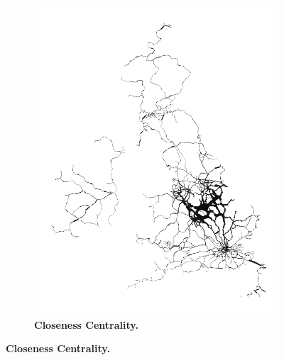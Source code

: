 \begin{figure}[H]
\begin{subfigure}[b]{.49\textwidth}
         \includegraphics[width=\textwidth]{rail/centrality.png}
        \caption{ \textbf{Closeness Centrality.}}
\end{subfigure}
 

\end{figure}
